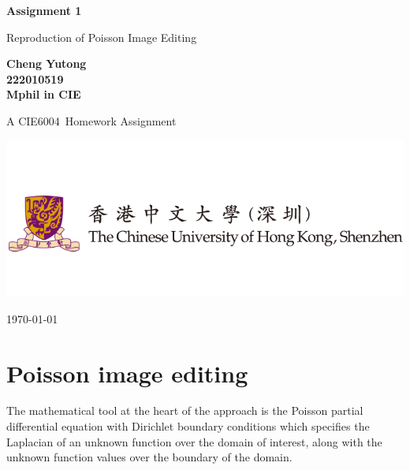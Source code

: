 \documentclass[10pt, a4paper]{article}%
\newcommand\course{CIE6004}                            %
\newcommand\hwnumber{1}                                 %
\newcommand\Information{Cheng Yutong\\222010519\\Mphil in CIE} %
\begin{document}
\begin{titlepage}
    \begin{center}
        \vspace*{3cm}
            
        \Huge
        \textbf{Assignment \hwnumber \ }
            
        \vspace{1cm}
        \huge
        
        Reproduction of Poisson Image Editing
            
        \vspace{1.5cm}
        \Large
            
        \textbf{\Information \ }                      %
        
            
        \vfill
        
        A \course \ Homework Assignment
            
        \vspace{1cm}
            
        \includegraphics[width=1\textwidth]{logo.png}
        \\
        
        \Large
        
        \today
            
    \end{center}
\end{titlepage}


\newpage
{
  \hypersetup{linkcolor=black}
  \tableofcontents
}

\newpage

\section{Poisson image editing}
The mathematical tool at the heart of the approach is the Poisson partial differential equation with Dirichlet boundary conditions which specifies the Laplacian of an unknown function over the domain of interest, along with the unknown function values over the boundary of the domain.
\end{document}
